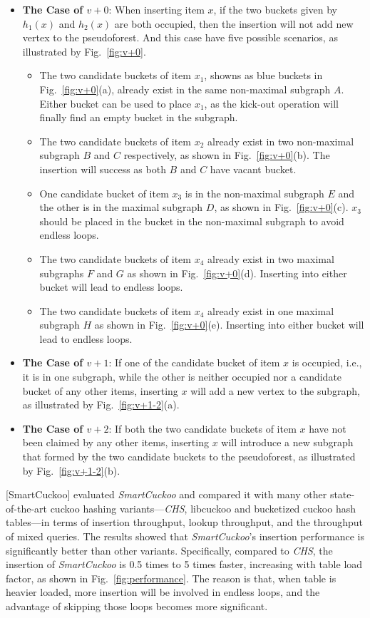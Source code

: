 \documentclass[12pt,conference,compsoc]{IEEEtran}
\begin{document}
\begin{itemize}
    \item \textbf{The Case of $v+0$}: When inserting item $x$, if the two buckets given by $h_1(x)$ and $h_2(x)$ are both occupied, then the insertion will not add new vertex to the pseudoforest. And this case have five possible scenarios, as illustrated by Fig.~\ref{fig:v+0}.
    \begin{itemize}
        \item The two candidate buckets of item $x_1$, showns as blue buckets in Fig.~\ref{fig:v+0}(a), already exist in the same non-maximal subgraph $A$. Either bucket can be used to place $x_1$, as the kick-out operation will finally find an empty bucket in the subgraph.
        \item The two candidate buckets of item $x_2$ already exist in two non-maximal subgraph $B$ and $C$ respectively, as shown in Fig.~\ref{fig:v+0}(b). The insertion will success as both $B$ and $C$ have vacant bucket.
        \item One candidate bucket of item $x_3$ is in the non-maximal subgraph $E$ and the other is in the maximal subgraph $D$, as shown in Fig.~\ref{fig:v+0}(c). $x_3$ should be placed in the bucket in the non-maximal subgraph to avoid endless loops.
        \item The two candidate buckets of item $x_4$ already exist in two maximal subgraphs $F$ and $G$ as shown in Fig.~\ref{fig:v+0}(d). Inserting into either bucket will lead to endless loops.
        \item The two candidate buckets of item $x_4$ already exist in one maximal subgraph $H$ as shown in Fig.~\ref{fig:v+0}(e). Inserting into either bucket will lead to endless loops.
    \end{itemize}
    \item \textbf{The Case of $v+1$}: If one of the candidate bucket of item $x$ is occupied, i.e., it is in one subgraph, while the other is neither occupied nor a candidate bucket of any other items, inserting $x$ will add a new vertex to the subgraph, as illustrated by Fig.~\ref{fig:v+1-2}(a).
    \item \textbf{The Case of $v+2$}: If both the two candidate buckets of item $x$ have not been claimed by any other items, inserting $x$ will introduce a new subgraph that formed by the two candidate buckets to the pseudoforest, as illustrated by Fig.~\ref{fig:v+1-2}(b).
\end{itemize}

[SmartCuckoo] evaluated \textit{SmartCuckoo} and compared it with many other state-of-the-art cuckoo hashing variants---\textit{CHS}, libcuckoo and bucketized cuckoo hash tables---in terms of insertion throughput, lookup throughput, and the throughput of mixed queries. The results showed that \textit{SmartCuckoo}'s insertion performance is significantly better than other variants. Specifically, compared to \textit{CHS}, the insertion of \textit{SmartCuckoo} is 0.5 times to 5 times faster, increasing with table load factor, as shown in Fig.~\ref{fig:performance}. The reason is that, when table is heavier loaded, more insertion will be involved in endless loops, and the advantage of skipping those loops becomes more significant.
\end{document}
